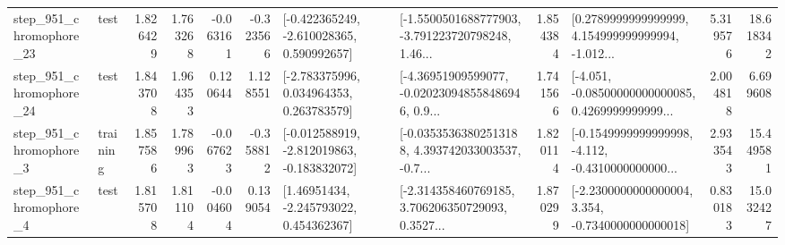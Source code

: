 \begin{tabular}{llrrrrllrlrr}
  step\_951\_chromophore\_23 &      test &      1.826429 &    1.763268 &     -0.063161 & -0.323566 &   [-0.422365249, -2.610028365, 0.590992657] &  [-1.5500501688777903, -3.791223720798248, 1.46... &       1.854384 &  [0.2789999999999999, 4.154999999999994, -1.012... &            5.319576 &         18.618342 \\
  step\_951\_chromophore\_24 &      test &      1.843708 &    1.964353 &      0.120644 &  1.128551 &    [-2.783375996, 0.034964353, 0.263783579] &  [-4.36951909599077, -0.020230948558486946, 0.9... &       1.741566 &  [-4.051, -0.08500000000000085, 0.4269999999999... &            2.004818 &          6.699608 \\
   step\_951\_chromophore\_3 &  training &      1.857586 &    1.789963 &     -0.067623 & -0.358812 &  [-0.012588919, -2.812019863, -0.183832072] &  [-0.03535363802513188, 4.393742033003537, -0.7... &       1.820114 &  [-0.1549999999999998, -4.112, -0.4310000000000... &            2.933543 &         15.449581 \\
   step\_951\_chromophore\_4 &      test &      1.815708 &    1.811104 &     -0.004604 &  0.139054 &     [1.46951434, -2.245793022, 0.454362367] &  [-2.314358460769185, 3.706206350729093, 0.3527... &       1.870299 &  [-2.2300000000000004, 3.354, -0.7340000000000018] &            0.830183 &         15.032427 \\
\bottomrule
\end{tabular}

